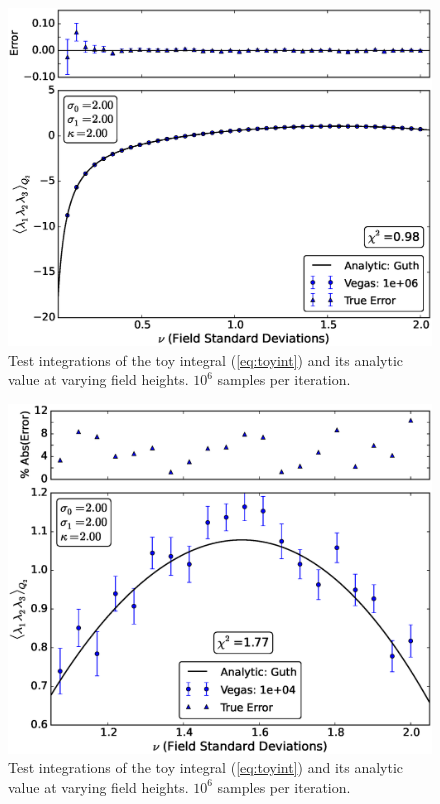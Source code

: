 \documentclass[10pt,letterpaper]{article}
\begin{document}
\begin{figure}[t] %
\centering %
\includegraphics[scale=0.45]{images/toy_int_e6_wide.eps} 
\caption{Test integrations of the toy integral (\ref{eq:toyint}) and its analytic value at varying field heights. $10^6$ samples per iteration.}
\label{fig:toy_e6_wide}
\end{figure}

\begin{figure}[t] %
\centering %
\includegraphics[scale=0.45]{images/toy_pcterr_e4.eps} 
\caption{Test integrations of the toy integral (\ref{eq:toyint}) and its analytic value at varying field heights. $10^6$ samples per iteration.}
\label{fig:toy_pcterr_e4}
\end{figure}
\end{document}
